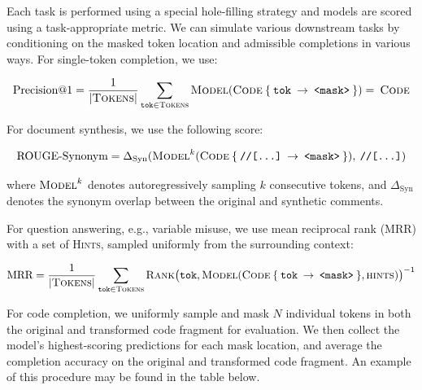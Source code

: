 \documentclass[usenames,dvipsnames]{article} %
\begin{document}
  Each task is performed using a special hole-filling strategy and models are scored using a task-appropriate metric. We can simulate various downstream tasks by conditioning on the masked token location and admissible completions in various ways. For single-token completion, we use:

  \begin{equation*}
    \text{Precision@1} = \frac{1}{{|\textsc{Tokens}|}}\sum_{\texttt{tok}\in \textsc{Tokens}}\textsc{Model}(\textsc{Code}\:\{\:\texttt{tok}\:\rightarrow\:\texttt{<mask>}\:\}) = \:\textsc{Code}
  \end{equation*}

  For document synthesis, we use the following score:

  \begin{equation*}
    \text{ROUGE-Synonym} = \Delta_{\text{Syn}}(\textsc{Model}^{k}(\textsc{Code}\:\{\:\texttt{//[...]}\:\rightarrow\:\texttt{<mask>}\:\}), \:\texttt{//[...]})
  \end{equation*}

  where $\textsc{Model}^{k}$ denotes autoregressively sampling $k$ consecutive tokens, and $\Delta_\text{Syn}$ denotes the synonym overlap between the original and synthetic comments.

  For question answering, e.g., variable misuse, we use mean reciprocal rank (MRR) with a set of \textsc{Hints}, sampled uniformly from the surrounding context:

  \begin{equation*}
    \text{MRR} = \frac{1}{|\textsc{Tokens}|} \sum_{\texttt{tok}\in\textsc{Tokens}} \textsc{Rank}\big(\texttt{tok}, \textsc{Model}(\textsc{Code}\:\{\:\texttt{tok}\:\rightarrow\:\texttt{<mask>}\:\}, \textsc{hints})\big)^{-1}
  \end{equation*}


  For code completion, we uniformly sample and mask $N$ individual tokens in both the original and transformed code fragment for evaluation. We then collect the model's highest-scoring predictions for each mask location, and average the completion accuracy on the original and transformed code fragment. An example of this procedure may be found in the table below.
\end{document}
